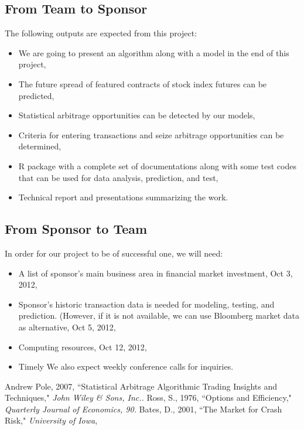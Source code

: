 \documentclass[12pt,letterpaper]{article}
\theoremstyle{definition}
\begin{document}
\subsection{From Team to Sponsor} %
The following outputs are expected from this project:
\begin{itemize}
   \item We are going to present an algorithm along with a model in the end of this project,
     \item The future spread of featured contracts of stock index futures can be predicted, 
    \item Statistical arbitrage opportunities can be detected by our models,
    \item Criteria for entering transactions and seize arbitrage opportunities can be determined,
    \item	R package with a complete set of documentations along with some test codes that can be used for data analysis, prediction, and test,
    \item Technical report and presentations summarizing the work.
\end{itemize}

\subsection{From Sponsor to Team} %

In order for our project to be of successful one, we will need:
\begin{itemize}
    \item A list of sponsor's main business area in financial market investment, Oct 3, 2012,
    \item Sponsor's historic transaction data is needed for modeling, testing, and prediction. (However, if it is not available, we can use Bloomberg market data as alternative, Oct 5, 2012,
    \item Computing resources, Oct 12, 2012,
    \item Timely We also expect weekly conference calls for inquiries.


\end{itemize}


\begin{thebibliography}{4}  
\bibitem{} Andrew Pole, 2007, ``Statistical Arbitrage Algorithmic Trading Insights and Techniques," \emph{John Wiley \& Sons, Inc..} 
\bibitem{}  Ross, S., 1976, ``Options and Efficiency," \emph{Quarterly Journal of Economics, 90.}
\bibitem{}  Bates, D., 2001, ``The Market for Crash Risk," \emph{University of Iowa},

\end{thebibliography}
\end{document}
